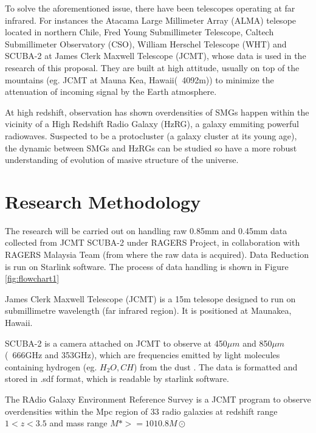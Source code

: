 \documentclass{article}
\begin{document}
\noindent To solve the aforementioned issue, there have been telescopes operating at far infrared. For instances the Atacama Large Millimeter Array (ALMA) telesope located in northern Chile, Fred Young Submillimeter Telescope, Caltech Submillimeter Observatory (CSO), William Herschel Telescope (WHT)\parencite{Phillips2013} and SCUBA-2 at James Clerk Maxwell Telescope (JCMT), whose data is used in the research of this proposal. They are built at high attitude, usually on top of the mountains (eg. JCMT at Mauna Kea, Hawaii(~4092m)) to minimize the attenuation of incoming signal by the Earth atmosphere.\parencite{Phillips2013}
\medskip

\noindent At high redshift, observation has shown overdensities of SMGs happen within the vicinity of a High Redshift Radio Galaxy (HzRG), a galaxy emmiting powerful radiowaves. Suspected to be a protocluster (a galaxy cluster at its young age), the dynamic between SMGs and HzRGs can be studied so have a more robust understanding of evolution of masive structure of the universe.\parencite{Saxena2018}

\section{Research Methodology}

The research will be carried out on handling raw 0.85mm and 0.45mm data collected from JCMT SCUBA-2 under RAGERS Project, in collaboration with RAGERS Malaysia Team (from where the raw data is acquired). Data Reduction is run on Starlink software. The process of data handling is shown in Figure \ref{fig:flowchart1}
\medskip

\noindent James Clerk Maxwell Telescope (JCMT) is a 15m telesope designed to run on submillimetre wavelength (far infrared region). It is positioned at Maunakea, Hawaii. 
\medskip

\noindent SCUBA-2 is a camera attached on JCMT to observe at 450$\mu m$ and 850$\mu m$ (~666GHz and 353GHz), which are frequencies emitted by light molecules containing hydrogen (eg. $H_2O,CH$) from the dust \parencite{Phillips2013}. The data is formatted and stored in .sdf format, which is readable by starlink software.
\medskip

\noindent The RAdio Galaxy Environment Reference Survey is a JCMT program to observe overdensities within the Mpc region of 33 radio galaxies at redshift range $1 < z < 3.5$ and mass range $M\ast >=1010.8M\odot $ \parencite{ragers2021}
\medskip
\end{document}
